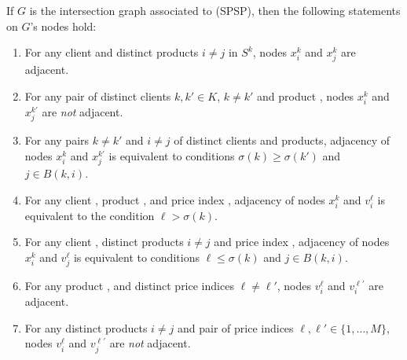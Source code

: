 \begin{proposition}
    \label{pro:characterisation}

    If $G$ is the intersection graph associated to \rm{(SPSP)}, then the
    following statements on $G$'s nodes hold:
    \begin{enumerate}
        \item %
	    For any client \kk and distinct products $i \neq j$ in $S^k$, nodes
	    $x_i^k$ and $x_j^k$ are adjacent.
	\item %
	    For any pair of distinct clients $k, k' \in K$, $k \neq k'$ and
	    product \ii, nodes $x_i^k$ and $x_j^{k'}$ are \emph{not} adjacent.
	\item %
	    For any pairs $k \neq k'$ and $i \neq j$ of distinct clients and
	    products, adjacency of nodes $x_i^k$ and $x_j^{k'}$ is equivalent to
	    conditions $\sigma(k) \geq \sigma(k')$ and $j \in B(k, i)$.
	\item %
	    For any client \kk, product \ii , and price index \lm, adjacency of
	    nodes $x_i^k$ and $v_i^\ell$ is equivalent to the condition $\ell >
	    \sigma(k)$.
	\item %
	    For any client \kk, distinct products $i \neq j$ and price index
	    \lm, adjacency of nodes $x_i^k$ and $v_j^\ell$ is equivalent to
	    conditions $\ell \leq \sigma(k)$ and $j \in B(k, i)$.
	\item %
	    For any product \ii, and distinct price indices $\ell \neq \ell'$,
	    nodes $v_i^\ell$ and $v_i^{\ell'}$ are adjacent.
	\item %
	    For any distinct products $i \neq j$ and pair of price indices
	    $\ell, \ell' \in \{1, \ldots, M\}$, nodes $v_i^\ell$ and
	    $v_j^{\ell'}$ are \emph{not} adjacent.
    \end{enumerate}
\end{proposition}

